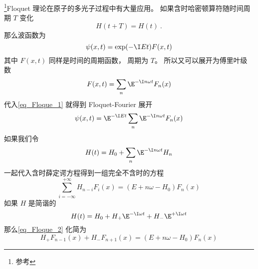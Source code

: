 

\footnote{参考\cite{Bransden}}Floquet 理论在原子的多光子过程中有大量应用。 如果含时哈密顿算符随时间周期 $T$ 变化
\begin{equation}
H(t+T) = H(t)~.
\end{equation}
那么波函数为
\begin{equation}\label{eq_Floque_1}
\psi(x, t) = \exp(-\I Et) F(x, t)
\end{equation}
其中 $F(x, t)$ 同样是时间的周期函数， 周期为 $T$。 所以又可以展开为傅里叶级数
\begin{equation}
F(x, t) = \sum_{n} \E^{-\I n\omega t} F_n(x)
\end{equation}
代入\autoref{eq_Floque_1} 就得到 Floquet-Fourier 展开
\begin{equation}
\psi(x, t) = \E^{-\I Et} \sum_{n} \E^{-\I n\omega t} F_n(x)
\end{equation}
如果我们令
\begin{equation}
H(t) = H_0 + \sum_{n} \E^{-\I n\omega t} H_n
\end{equation}
一起代入含时薛定谔方程得到一组完全不含时的方程
\begin{equation}\label{eq_Floque_2}
\sum_{i=-\infty}^{+\infty} H_{n-i} F_i(x) = (E + n\omega - H_0) F_n(x)
\end{equation}
如果 $H$ 是简谐的
\begin{equation}
H(t) = H_0 + H_+\E^{-\I\omega t} + H_-\E^{+\I\omega t}
\end{equation}
那么\autoref{eq_Floque_2} 化简为
\begin{equation}
H_{+} F_{n-1}(x) + H_{-} F_{n+1}(x) = (E + n\omega - H_0) F_n(x)
\end{equation}
